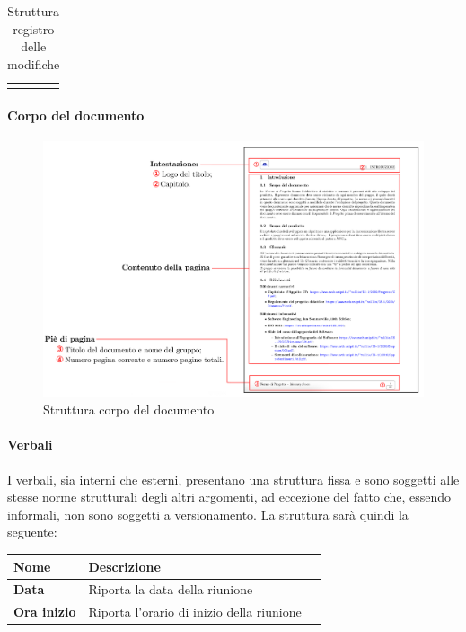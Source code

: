 {\begin{longtable}{L{.210\freewidth} L{.6\freewidth} L{.080\freewidth}}
		\bottomrule
		\hiderowcolors
		\caption{Struttura registro delle modifiche}
	\end{longtable}


\paragraph*{Corpo del documento}       

\begin{figure}[H]
    \centering
    \includegraphics[scale = 0.6]{components/immagini/corpodocumento.png}
    \caption{Struttura corpo del documento}
\end{figure}


\paragraph*{Verbali}      
I verbali, sia interni che esterni, presentano una struttura fissa e sono soggetti alle stesse norme strutturali degli altri argomenti, ad eccezione del fatto che, essendo informali, non sono soggetti a versionamento.
La struttura sarà quindi la seguente:

	\setlength{\freewidth}{\dimexpr\textwidth-1\tabcolsep}
	\renewcommand{\arraystretch}{1.5}
	\setlength{\aboverulesep}{0pt}
	\setlength{\belowrulesep}{0pt}
	\begin{longtable}{L{.210\freewidth} L{.6\freewidth} L{.080\freewidth}}
		\textbf{Nome} & \textbf{Descrizione} \\
		\toprule
		\endhead		
		\textbf{Data} & Riporta la data della riunione \\
		\textbf{Ora inizio} & Riporta l'orario di inizio della riunione\\
		

\end{longtable}}
